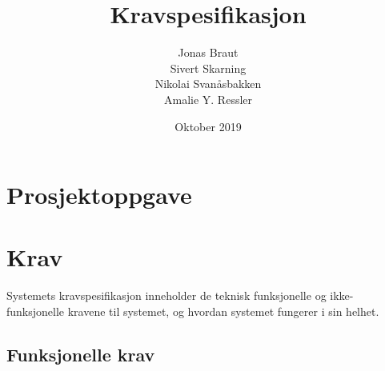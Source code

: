 \documentclass[norsk]{article}
\title{Kravspesifikasjon}
\author{Jonas Braut \\ Sivert Skarning \\ Nikolai Svanåsbakken \\ Amalie Y. Ressler}
\date{Oktober 2019}
\begin{document}
\maketitle
\newpage
\tableofcontents
\newpage
\section{Prosjektoppgave}


\section{Krav}
Systemets kravspesifikasjon inneholder de teknisk funksjonelle og ikke-funksjonelle kravene til systemet, og hvordan systemet fungerer i sin helhet.
\subsection{Funksjonelle krav}
\end{document}
